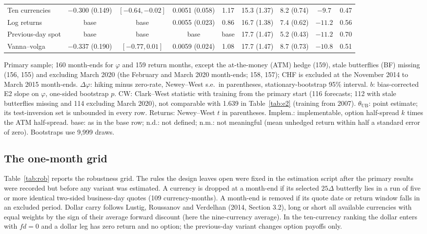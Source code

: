 \documentclass[11pt]{article}
\theoremstyle{result}
\newcommand{\fd}{\mathit{fd}}
\newcommand{\thUB}{\theta_{\mathrm{UB}}}
\newcommand{\D}{\Delta}
\begin{document}
\begin{table}[t]
\begin{tabular}{lcccccccc}
Ten currencies & $-0.300$ (0.149) & $[-0.64,-0.02]$ & 0.0051 (0.058) & 1.17 & 15.3 (1.37) & 8.2 (0.74) & $-9.7$ & 0.47 \\
Log returns & base & base & 0.0055 (0.023) & 0.86 & 16.7 (1.38) & 7.4 (0.62) & $-11.2$ & 0.56 \\
Previous-day spot & base & base & base & base & 17.7 (1.47) & 5.2 (0.43) & $-11.2$ & 0.70 \\
Vanna--volga & $-0.337$ (0.190) & $[-0.77,0.01]$ & 0.0059 (0.024) & 1.08 & 17.7 (1.47) & 8.7 (0.73) & $-10.8$ & 0.51 \\
\bottomrule
\end{tabular}
\par\medskip
\begin{minipage}{0.97\linewidth}\footnotesize
Primary sample; 160 month-ends for $\varphi$ and 159 return months, except the at-the-money (ATM) hedge (159), stale butterflies (BF) missing (156, 155) and excluding March 2020 (the February and March 2020 month-ends; 158, 157); CHF is excluded at the November 2014 to March 2015 month-ends. $\D\varphi$: hiking minus zero-rate, Newey--West s.e.\ in parentheses, stationary-bootstrap 95\% interval. $b$: bias-corrected E2 slope on $\varphi$, one-sided bootstrap $p$. CW: Clark--West statistic with training from the primary start (116 forecasts; 112 with stale butterflies missing and 114 excluding March 2020), not comparable with 1.639 in Table~\ref{tab:e2} (training from 2007). $\thUB$: point estimate; its test-inversion set is unbounded in every row. Returns: Newey--West $t$ in parentheses. Implem.: implementable, option half-spread $k$ times the ATM half-spread. base: as in the base row; n.d.: not defined; n.m.: not meaningful (mean unhedged return within half a standard error of zero). Bootstraps use 9,999 draws.
\end{minipage}
\end{table}

\subsection{The one-month grid}

Table~\ref{tab:rob} reports the robustness grid. The rules the design leaves open were fixed in the estimation script after the primary results were recorded but before any variant was estimated. A currency is dropped at a month-end if its selected $25\D$ butterfly lies in a run of five or more identical two-sided business-day quotes (109 currency-months). A month-end is removed if its quote date or return window falls in an excluded period. Dollar carry follows Lustig, Roussanov and Verdelhan (2014, Section 3.2), long or short all available currencies with equal weights by the sign of their average forward discount (here the nine-currency average). In the ten-currency ranking the dollar enters with $\fd=0$ and a dollar leg has zero return and no option; the previous-day variant changes option payoffs only.
\end{document}

